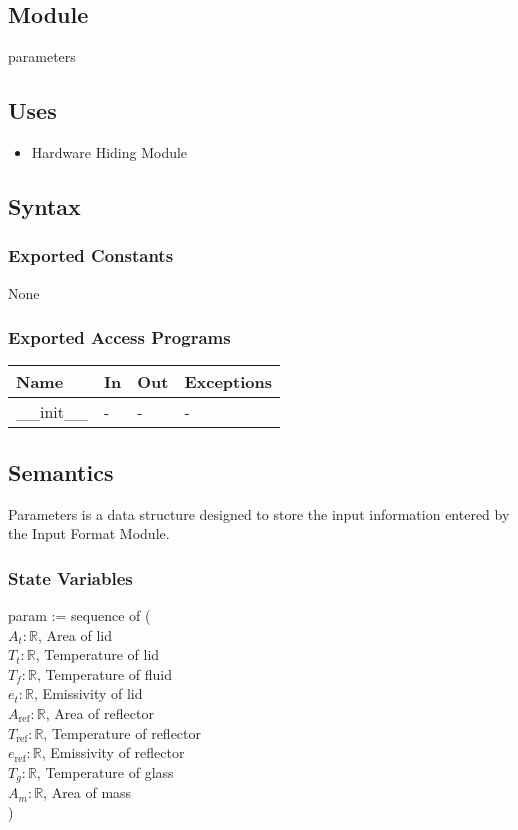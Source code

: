 \documentclass[12pt, titlepage]{article}
\begin{document}
\subsection{Module}

parameters

\subsection{Uses}

\begin{itemize}
    \item Hardware Hiding Module
\end{itemize}

\subsection{Syntax}

\subsubsection{Exported Constants}
None 

\subsubsection{Exported Access Programs}

\begin{center}
\begin{tabular}{p{2cm} p{4cm} p{4cm} p{2cm}}
\hline
\textbf{Name} & \textbf{In} & \textbf{Out} & \textbf{Exceptions} \\
\hline
\_\_init\_\_  & - & - & - \\
\hline
\end{tabular}
\end{center}

\subsection{Semantics}
Parameters is a data structure designed to store the input information entered by the Input Format Module. 
\subsubsection{State Variables}

param := sequence of ( \\
$A_t: \mathbb{R}$, Area of lid \\
$T_t: \mathbb{R}$, Temperature of lid \\ 
$T_f: \mathbb{R}$, Temperature of fluid \\
$e_t: \mathbb{R}$, Emissivity of lid \\
$A_\text{ref}: \mathbb{R}$, Area of reflector \\
$T_\text{ref}: \mathbb{R}$, Temperature of reflector  \\
$e_\text{ref}: \mathbb{R}$, Emissivity of reflector  \\
$T_g: \mathbb{R}$, Temperature of glass   \\ 
$A_m: \mathbb{R}$, Area of mass 
\\ )
\end{document}

